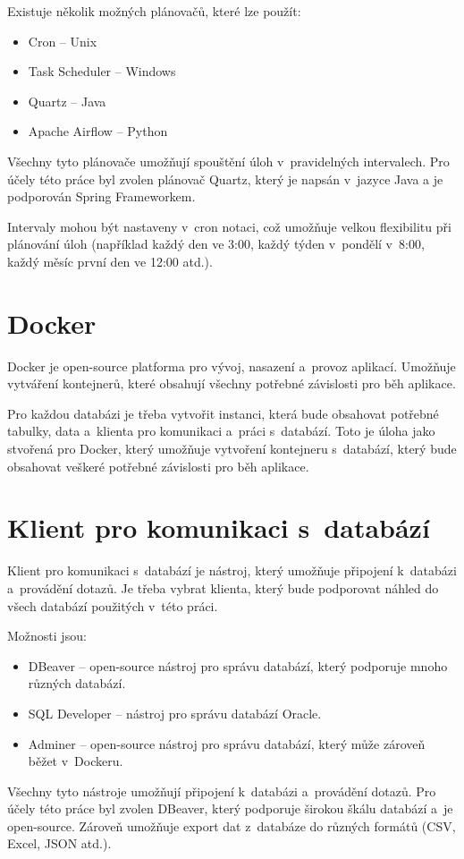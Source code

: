 Existuje několik možných plánovačů, které lze použít:
\begin{itemize}
    \item Cron -- Unix
    \item Task Scheduler -- Windows
    \item Quartz -- Java
    \item Apache Airflow -- Python
\end{itemize}

Všechny tyto plánovače umožňují spouštění úloh v~pravidelných intervalech.  
Pro účely této práce byl zvolen plánovač Quartz, který je napsán v~jazyce Java a  
je podporován Spring Frameworkem.  

Intervaly mohou být nastaveny v~cron notaci, což umožňuje velkou flexibilitu při plánování úloh  
(například každý den ve 3:00, každý týden v~pondělí v~8:00, každý měsíc první den ve 12:00 atd.).

\section{Docker}

Docker je open-source platforma pro vývoj, nasazení a~provoz aplikací.  
Umožňuje vytváření kontejnerů, které obsahují všechny potřebné závislosti pro běh aplikace.  

Pro každou databázi je třeba vytvořit instanci, která bude obsahovat potřebné tabulky, data  
a~klienta pro komunikaci a~práci s~databází. Toto je úloha jako stvořená pro Docker,  
který umožňuje vytvoření kontejneru s~databází, který bude obsahovat veškeré potřebné závislosti  
pro běh aplikace.  
\cite{docker}

\section{Klient pro komunikaci s~databází}

Klient pro komunikaci s~databází je nástroj, který umožňuje připojení k~databázi a~provádění dotazů.  
Je třeba vybrat klienta, který bude podporovat náhled do všech databází použitých v~této práci.

Možnosti jsou:
\begin{itemize}
    \item DBeaver -- open-source nástroj pro správu databází, který podporuje mnoho různých databází.
    \item SQL Developer -- nástroj pro správu databází Oracle.
    \item Adminer -- open-source nástroj pro správu databází, který může zároveň běžet v~Dockeru.
\end{itemize}

Všechny tyto nástroje umožňují připojení k~databázi a~provádění dotazů.  
Pro účely této práce byl zvolen DBeaver, který podporuje širokou škálu databází a~je open-source.  
Zároveň umožňuje export dat z~databáze do různých formátů (CSV, Excel, JSON atd.).  
\cite{dbeaver}